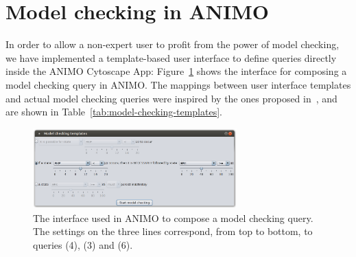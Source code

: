 \documentclass{llncs}
\begin{document}



\section{Model checking in ANIMO}\label{sec:animo-model-checking-ui}
In order to allow a non-expert user to profit from the power of model checking, we have implemented
a template-based user interface to define queries directly inside the ANIMO Cytoscape App:
Figure~\ref{fig:model-checking-ui} shows the interface for composing a model checking query in ANIMO.
The mappings between user interface templates and actual model checking queries were inspired
by the ones proposed in~\cite{hidde-templates}, and are shown in Table~\ref{tab:model-checking-templates}.

\begin{figure}[htb]
  \begin{center}
    \includegraphics[width=0.7\textwidth]{images/model_checking_ui}
  \end{center}
  \caption{\scriptsize The interface used in ANIMO to compose a model checking query.
  The settings on the three lines correspond, from top to bottom,
  to queries (4), (3) and (6).\label{fig:model-checking-ui}}
\end{figure}
\end{document}
